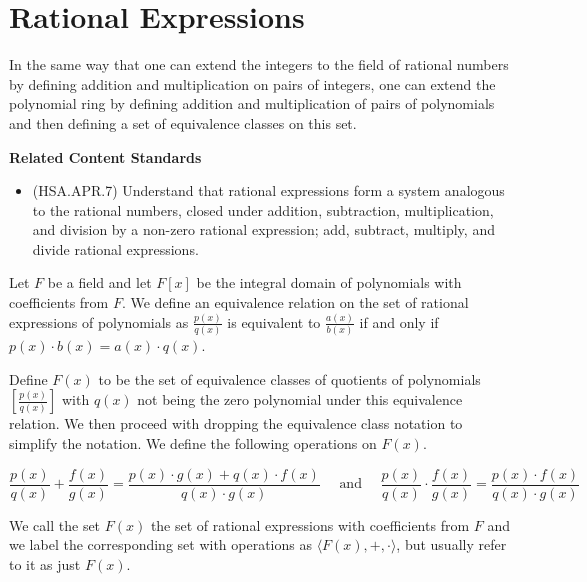 \documentclass[
]{book}
\providecommand{\tightlist}{%
  \setlength{\itemsep}{0pt}\setlength{\parskip}{0pt}}
\newenvironment{standards}{}{}
\let\stdsection\section
\renewcommand\section{\newpage\stdsection}
\theoremstyle{definition}
\theoremstyle{definition}
\theoremstyle{definition}
\theoremstyle{definition}
\theoremstyle{remark}
\begin{document}
\hypertarget{rational-expressions}{%
\section{Rational Expressions}\label{rational-expressions}}

In the same way that one can extend the integers to the field of rational numbers by defining addition and multiplication on pairs of integers, one can extend the polynomial ring by defining addition and multiplication of pairs of polynomials and then defining a set of equivalence classes on this set.

\begin{standards}

\begin{center}
\textbf{Related Content Standards}

\end{center}

\begin{itemize}
\tightlist
\item
  (HSA.APR.7) Understand that rational expressions form a system analogous to the rational numbers, closed under addition, subtraction, multiplication, and division by a non-zero rational expression; add, subtract, multiply, and divide rational expressions.
\end{itemize}

\end{standards}

Let \(F\) be a field and let \(F[x]\) be the integral domain of polynomials with coefficients from \(F\). We define an equivalence relation on the set of rational expressions of polynomials as \(\frac{p(x)}{q(x)}\) is equivalent to \(\frac{a(x)}{b(x)}\) if and only if \(p(x) \cdot b(x)=a(x)\cdot q(x)\).

Define \(F(x)\) to be the set of equivalence classes of quotients of polynomials \(\left[\frac{p(x)}{q(x)}\right]\) with \(q(x)\) not being the zero polynomial under this equivalence relation. We then proceed with dropping the equivalence class notation to simplify the notation. We define the following operations on \(F(x)\).

\[\frac{p(x)}{q(x)} + \frac{f(x)}{g(x)} = \frac{p(x)\cdot g(x) + q(x) \cdot f(x)}{q(x)\cdot g(x)} \quad \mbox{ and } \quad \frac{p(x)}{q(x)} \cdot \frac{f(x)}{g(x)} = \frac{p(x) \cdot f(x)}{q(x)\cdot g(x)}\]

We call the set \(F(x)\) the set of rational expressions with coefficients from \(F\) and we label the corresponding set with operations as \(\langle F(x),+,\cdot\rangle\), but usually refer to it as just \(F(x)\).
\end{document}
